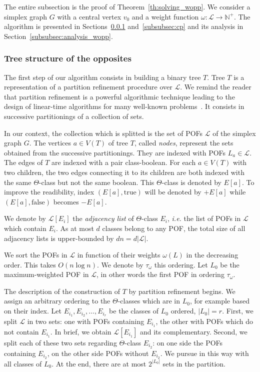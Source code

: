 \documentclass{article}
\newcommand{\card}[1]{\left| #1 \right|}
\begin{document}
The entire subsection is the proof of Theorem~\ref{th:solving_wopp}. We consider a simplex graph $G$ with a central vertex $v_0$ and a weight function $\omega : \mathcal{L} \rightarrow \mathbb{N}^+$. The algorithm is presented in Sections~\ref{subsubsec:tree_opp} and~\ref{subsubsec:cp} and its analysis in Section~\ref{subsubsec:analysis_wopp}.

\subsubsection{Tree structure of the opposites} \label{subsubsec:tree_opp}

The first step of our algorithm consists in building a binary tree $T$. Tree $T$ is a representation of a partition refinement procedure over $\mathcal{L}$. We remind the reader that partition refinement is a powerful algorithmic technique leading to the design of linear-time algorithms for many well-known problems~\cite{HaPaVi99,PaTa87}. It consists in successive partitionings of a collection of sets.

In our context, the collection which is splitted is the set of POFs $\mathcal{L}$ of the simplex graph $G$. The vertices $a \in V(T)$ of tree $T$, called \textit{nodes}, represent the sets obtained from the successive partitionings. They are indexed with POFs $L_a \in \mathcal{L}$. The edges of $T$ are indexed with a pair class-boolean. For each $a \in V(T)$ with two children, the two edges connecting it to its children are both indexed with the same $\Theta$-class but not the same boolean. This $\Theta$-class is denoted by $E\left[a\right]$. To improve the readibility, index $(E\left[a\right],\mbox{true})$ will be denoted by $+E\left[a\right]$ while $(E\left[a\right],\mbox{false})$ becomes $-E\left[a\right]$.

We denote by $\mathcal{L}\left[E_i\right]$ the \textit{adjacency list} of $\Theta$-class $E_i$, {\em i.e.} the list of POFs in $\mathcal{L}$ which contain $E_i$. As at most $d$ classes belong to any POF, the total size of all adjacency lists is upper-bounded by $dn = d\card{\mathcal{L}}$.

We sort the POFs in $\mathcal{L}$ in function of their weights $\omega(L)$ in the decreasing order. This takes $O(n\log n)$. We denote by $\tau_{\omega}$ this ordering. Let $L_0$ be the maximum-weighted POF in $\mathcal{L}$, in other words the first POF in ordering $\tau_{\omega}$.

The description of the construction of $T$ by partition refinement begins. We assign an arbitrary ordering to the $\Theta$-classes which are in $L_0$, for example based on their index. Let $E_{i_1}, E_{i_2},\ldots, E_{i_r}$ be the classes of $L_0$ ordered, $\card{L_0} = r$. First, we split $\mathcal{L}$ in two sets: one with POFs containing $E_{i_1}$, the other with POFs which do not contain $E_{i_1}$. In brief, we obtain $\mathcal{L}\left[E_{i_1}\right]$ and its complementary. Second, we split each of these two sets regarding $\Theta$-class $E_{i_2}$: on one side the POFs containing $E_{i_2}$, on the other side POFs without $E_{i_2}$. We pursue in this way with all classes of $L_0$. At the end, there are at most $2^{\card{L_0}}$ sets in the partition.
\end{document}
